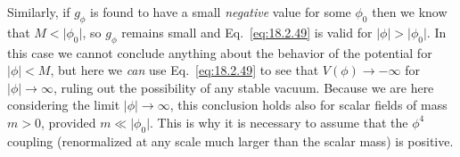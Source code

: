 Similarly, if $g_\phi$ is found to have a small \emph{negative} value for some
$\phi_0$ then we know that $M<\lvert\phi_0\rvert$, so $g_\phi$ remains small
and Eq.~\eqref{eq:18.2.49} is valid for
$\lvert\phi\rvert>\lvert\phi_0\rvert$. In this case we cannot conclude
anything about the behavior of the potential for $\lvert\phi\rvert<M$, but
here we \emph{can} use Eq.~\eqref{eq:18.2.49} to see that
$V(\phi)\to-\infty$ for $\lvert\phi\rvert\to\infty$, ruling out the
possibility of any stable vacuum. Because we are here considering the limit
$\lvert\phi\rvert\to\infty$, this conclusion holds also for scalar fields of
mass $m>0$, provided $m\ll\lvert\phi_0\rvert$. This is why it is necessary to
assume that the $\phi^4$ coupling (renormalized at any scale much larger than
the scalar mass) is positive.

